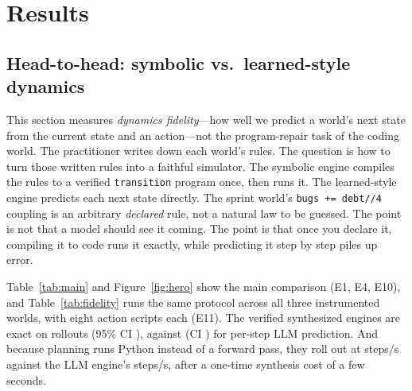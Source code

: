 \documentclass[11pt]{article}
\begin{document}
\section{Results}\label{sec:results}

\subsection{Head-to-head: symbolic vs.\ learned-style dynamics}
This section measures \emph{dynamics fidelity}---how well we predict a world's
next state from the current state and an action---not the program-repair task of
the coding world. The practitioner writes down each world's rules. The question
is how to turn those written rules into a faithful simulator. The symbolic engine
compiles the rules to a verified \texttt{transition} program once, then runs it.
The learned-style engine predicts each next state directly. The sprint world's
\texttt{bugs\,{+}{=}\,debt//4} coupling is an arbitrary \emph{declared} rule, not
a natural law to be guessed. The point is not that a model should see it coming.
The point is that once you declare it, compiling it to code runs it exactly,
while predicting it step by step piles up error.

Table~\ref{tab:main} and Figure~\ref{fig:hero} show the main comparison
(E1, E4, E10), and Table~\ref{tab:fidelity} runs the same protocol across
all three instrumented worlds, with eight action scripts each (E11). The
verified synthesized engines are exact on \MultiCodeExact{} rollouts (95\%
CI \MultiCodeCI), against \MultiLLMExact{} (CI \MultiLLMCI) for per-step LLM
prediction. And because planning runs Python instead of a forward
pass, they roll out at \CodeStepsPerSec{} steps/s against the LLM engine's
\LLMStepsPerSec{} steps/s, after a one-time synthesis cost of a few seconds.

\begin{table}[htb]\centering\small

\caption{Head-to-head engine comparison on the sprint world (E1, E4, E10):
mean first-divergence step and final $L^1$ error over three
\RolloutSteps-step rollouts against a ground-truth oracle; exact transition
accuracy on ten $10\times$ out-of-distribution probes; and rollout
throughput. A first divergence of \CodeFirstDivergence{} means no divergence
occurred within the rollout.}
\label{tab:main}
\end{table}

\begin{table}[htb]\centering\small

\caption{Multi-world replication (E11): exact \RolloutSteps-step rollouts per
world, eight scripts each, dynamics synthesized once per world by the 7B
generator. Totals carry 95\% Wilson CIs.}
\label{tab:fidelity}
\end{table}
\end{document}
